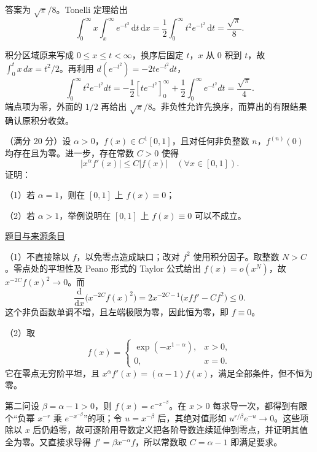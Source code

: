 \documentclass[UTF8,12pt,a4paper,fontset=fandol]{ctexart}
\begin{document}
\begin{solve}\label{ans:fin10-hi:3}

答案为 $\sqrt\pi/8$。Tonelli 定理给出
\[
\int_0^\infty x\int_x^\infty e^{-t^2}\,\mathrm dt\,\mathrm dx
=\frac12\int_0^\infty t^2e^{-t^2}\,\mathrm dt=\frac{\sqrt\pi}{8}.
\]

积分区域原来写成 $0\le x\le t<\infty$，换序后固定 $t$，$x$ 从 $0$ 积到 $t$，故 $\int_0^t x\,dx=t^2/2$。再利用 $d(e^{-t^2})=-2te^{-t^2}dt$，
\[
\int_0^\infty t^2e^{-t^2}dt
=-\frac12[te^{-t^2}]_0^\infty+\frac12\int_0^\infty e^{-t^2}dt=\frac{\sqrt\pi}{4}.
\]
端点项为零，外面的 $1/2$ 再给出 $\sqrt\pi/8$。非负性允许先换序，而算出的有限结果确认原积分收敛。

\end{solve}

\begin{example}[来源序号7]\label{ex:fin10-hi:7}\label{pr:fin10-hi:7}

（满分 20 分）设 $\alpha > 0$，$f(x) \in C^{1}[0,1]$，且对任何非负整数 $n$，$f^{(n)}(0)$ 均存在且为零。进一步，存在常数 $C > 0$ 使得
\[
\left| x^{\alpha} f'(x) \right| \leq C | f(x) | \quad (\forall x \in [0,1]).
\]
证明：

（1）若 $\alpha = 1$，则在 $[0,1]$ 上 $f(x) \equiv 0$；

（2）若 $\alpha > 1$，举例说明在 $[0,1]$ 上 $f(x) \equiv 0$ 可以不成立。

\par\href{https://github.com/lzxcr/cmc-mathematics/blob/64916fa1fdbc3e444a652eca204d5669058ee321/src/problems/finals/10/07.md}{题目与来源条目}

\end{example}

\begin{solve}\label{ans:fin10-hi:7}

（1）不直接除以 $f$，以免零点造成缺口；改对 $f^2$ 使用积分因子。取整数 $N>C$。零点处的平坦性及 Peano 形式的 Taylor 公式给出 $f(x)=o(x^N)$，故 $x^{-2C}f(x)^2\to0$。而
\[
\frac{\mathrm d}{\mathrm dx}\bigl(x^{-2C}f(x)^2\bigr)
=2x^{-2C-1}\bigl(xff'-Cf^2\bigr)\leq0.
\]
这个非负函数单调不增，且左端极限为零，因此恒为零，即 $f\equiv0$。

（2）取
\[
f(x)=\begin{cases}\exp(-x^{1-\alpha}),&x>0,\\0,&x=0.\end{cases}
\]
它在零点无穷阶平坦，且 $x^\alpha f'(x)=(\alpha-1)f(x)$，满足全部条件，但不恒为零。

第二问设 $\beta=\alpha-1>0$，则 $f(x)=e^{-x^{-\beta}}$。在 $x>0$ 每求导一次，都得到有限个“负幂 $x^{-r}$ 乘 $e^{-x^{-\beta}}$”的项；令 $u=x^{-\beta}$ 后，其绝对值形如 $u^{r/\beta}e^{-u}\to0$。这些项除以 $x$ 后仍趋零，故可逐阶用导数定义把各阶导数连续延伸到零点，并证明其值全为零。又直接求导得 $f'=\beta x^{-\alpha}f$，所以常数取 $C=\alpha-1$ 即满足要求。

\end{solve}
\end{document}
